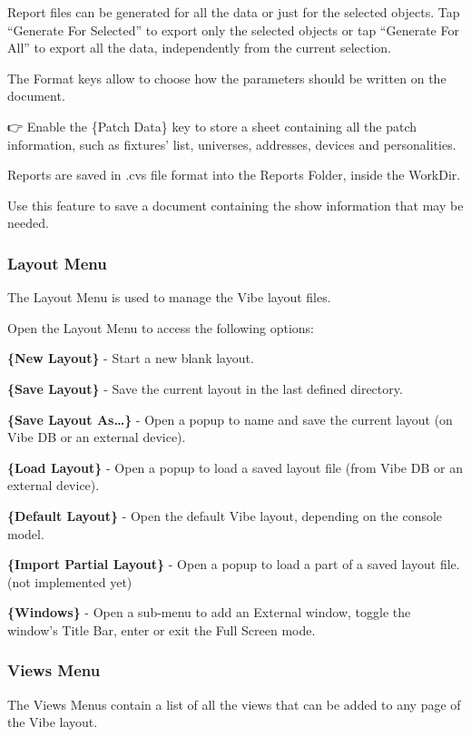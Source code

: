 \documentclass[
]{article}
\begin{document}
Report files can be generated for all the data or just for the selected objects.
Tap ``Generate For Selected'' to export only the selected objects or tap ``Generate For All'' to export all the data, independently from the current selection.

The Format keys allow to choose how the parameters should be written on the document.

👉 Enable the \{Patch Data\} key to store a sheet containing all the patch information, such as fixtures' list, universes, addresses, devices and personalities.

Reports are saved in .cvs file format into the Reports Folder, inside the WorkDir.

Use this feature to save a document containing the show information that may be needed.

\hypertarget{layout-menu}{%
\subsubsection{Layout Menu}\label{layout-menu}}

The Layout Menu is used to manage the Vibe layout files.

Open the Layout Menu to access the following options:

\textbf{\{New Layout\}} - Start a new blank layout.

\textbf{\{Save Layout\}} - Save the current layout in the last defined directory.

\textbf{\{Save Layout As\ldots\}} - Open a popup to name and save the current layout (on Vibe DB or an external device).

\textbf{\{Load Layout\}} - Open a popup to load a saved layout file (from Vibe DB or an external device).

\textbf{\{Default Layout\}} - Open the default Vibe layout, depending on the console model.

\textbf{\{Import Partial Layout\}} - Open a popup to load a part of a saved layout file. { (not implemented yet) }

\textbf{\{Windows\}} - Open a sub-menu to add an External window, toggle the window's Title Bar, enter or exit the Full Screen mode.

\hypertarget{views-menu}{%
\subsubsection{Views Menu}\label{views-menu}}

The Views Menus contain a list of all the views that can be added to any page of the Vibe layout.
\end{document}
